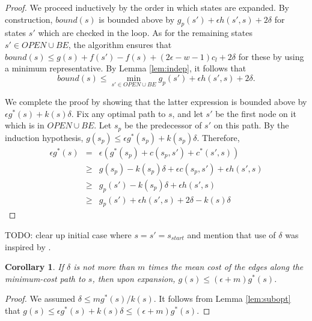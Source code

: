 \documentclass[letterpaper]{article}
\newtheorem{cor}{Corollary}
\begin{document}
\begin{proof}
We proceed inductively by the order in which states are expanded. By construction, $bound(s)$ is bounded above by $g_p(s') + \epsilon h(s',s) + 2\delta$ for states $s'$ which are checked in the loop. As for the remaining states $s' \in OPEN \cup BE$, the algorithm ensures that $bound(s) \le g(s) + f(s') - f(s) + (2\epsilon-w-1) c_l + 2\delta$ for these by using a minimum representative. By Lemma \ref{lem:indep}, it follows that
\[bound(s) \le \min_{s' \in OPEN \cup BE} g_p(s') + \epsilon h(s',s) + 2\delta.\]

We complete the proof by showing that the latter expression is bounded above by $\epsilon g^*(s) + k(s)\delta$. Fix any optimal path to $s$, and let $s'$ be the first node on it which is in $OPEN \cup BE$. Let $s_p$ be the predecessor of $s'$ on this path. By the induction hypothesis, $g(s_p) \le \epsilon g^*(s_p) + k(s_p)\delta$. Therefore,
\begin{eqnarray*}
\epsilon g^*(s)&=& \epsilon\left(g^*(s_p) + c(s_p,s') + c^*(s',s)\right)
\\&\ge& g(s_p) -  k(s_p)\delta + \epsilon c(s_p,s') + \epsilon h(s',s)
\\&\ge& g_p(s') - k(s_p)\delta + \epsilon h(s',s)
\\&\ge& g_p(s') + \epsilon h(s',s) + 2\delta - k(s)\delta
\end{eqnarray*}
\end{proof}

TODO: clear up initial case where $s = s' = s_{start}$ and mention that use of $\delta$ was inspired by \cite{klein1997randomized}.

\begin{cor}
\label{cor:subopt}
If $\delta$ is not more than $m$ times the mean cost of the edges along the minimum-cost path to $s$, then upon expansion, $g(s) \le (\epsilon + m)g^*(s)$.
\end{cor}

\begin{proof}
We assumed $\delta \le m g^*(s) / k(s)$.
It follows from Lemma \ref{lem:subopt} that $g(s) \le \epsilon g^*(s) + k(s)\delta \le (\epsilon + m)g^*(s)$.
\end{proof}



\end{document}
